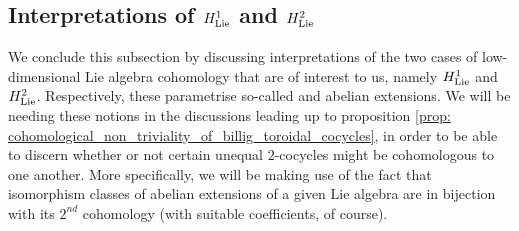     \subsection{Interpretations of \texorpdfstring{$H^1_{\mathrm{Lie}}$}{} and \texorpdfstring{$H^2_{\mathrm{Lie}}$}{}}
        We conclude this subsection by discussing interpretations of the two cases of low-dimensional Lie algebra cohomology that are of interest to us, namely $H^1_{\mathrm{Lie}}$ and $H^2_{\mathrm{Lie}}$. Respectively, these parametrise so-called  and abelian extensions. We will be needing these notions in the discussions leading up to proposition \ref{prop: cohomological_non_triviality_of_billig_toroidal_cocycles}, in order to be able to discern whether or not certain unequal $2$-cocycles might be cohomologous to one another. More specifically, we will be making use of the fact that isomorphism classes of abelian extensions of a given Lie algebra are in bijection with its $2^{nd}$ cohomology (with suitable coefficients, of course).
        
